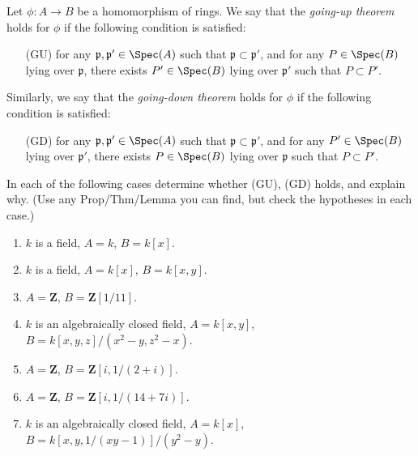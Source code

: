 \begin{definition}
\label{definition-GU-GD}
Let $\phi : A \to B$ be a homomorphism of rings. We say
that the {\it going-up theorem} holds for $\phi$ if the
following condition is satisfied:
\begin{itemize}
\item[(GU)] for any ${\mathfrak p}, {\mathfrak p}' \in \Spec(A)$ such that
${\mathfrak p} \subset {\mathfrak p}'$, and for any $P \in \Spec(B)$ lying
over ${\mathfrak p}$, there exists $P'\in \Spec(B)$ lying
over ${\mathfrak p}'$ such that $P \subset P'$.
\end{itemize}
Similarly, we say that the {\it going-down theorem} holds for $\phi$
if the following condition is satisfied:
\begin{itemize}
\item[(GD)] for any ${\mathfrak p}, {\mathfrak p}' \in \Spec(A)$ such that
${\mathfrak p} \subset {\mathfrak p}'$, and for any
$P' \in \Spec(B)$ lying
over ${\mathfrak p}'$, there exists $P\in \Spec(B)$ lying
over ${\mathfrak p}$ such that $P \subset P'$.
\end{itemize}
\end{definition}

\begin{exercise}
\label{exercise-GU-GD}
In each of the following cases determine whether
(GU), (GD) holds, and explain why. (Use any Prop/Thm/Lemma you can find,
but check the hypotheses in each case.)
\begin{enumerate}
\item $k$ is a field, $A = k$, $B = k[x]$.
\item $k$ is a field, $A = k[x]$, $B = k[x, y]$.
\item $A = {\mathbf Z}$, $B = {\mathbf Z}[1/11]$.
\item $k$ is an algebraically closed field, $A = k[x, y]$,
$B = k[x, y, z]/(x^2-y, z^2-x)$.
\item $A = {\mathbf Z}$, $B = {\mathbf Z}[i, 1/(2 + i)]$.
\item $A = {\mathbf Z}$, $B = {\mathbf Z}[i, 1/(14 + 7i)]$.
\item $k$ is an algebraically closed field, $A = k[x]$,
$B = k[x, y, 1/(xy-1)]/(y^2-y)$.
\end{enumerate}
\end{exercise}

